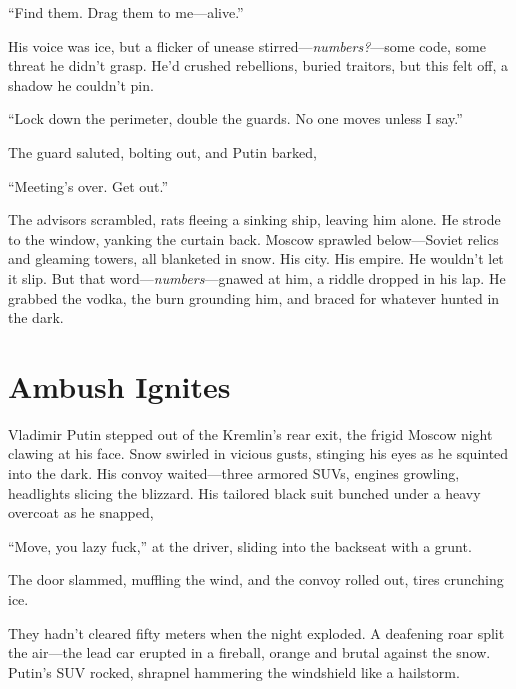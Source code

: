 \documentclass[12pt]{book}
\begin{document}
\begin{quoting}[leftmargin=1.5em, rightmargin=1em]
\enquote{Find them. Drag them to me—alive.}
\end{quoting}

His voice was ice, but a flicker of unease stirred—\emph{numbers?}—some code, some threat he didn’t grasp. He’d crushed rebellions, buried traitors, but this felt off, a shadow he couldn’t pin.

\begin{quoting}[leftmargin=1.5em, rightmargin=1em]
\enquote{Lock down the perimeter, double the guards. No one moves unless I say.}
\end{quoting}

The guard saluted, bolting out, and Putin barked,

\begin{quoting}[leftmargin=1.5em, rightmargin=1em]
\enquote{Meeting’s over. Get out.}
\end{quoting}

The advisors scrambled, rats fleeing a sinking ship, leaving him alone. He strode to the window, yanking the curtain back. Moscow sprawled below—Soviet relics and gleaming towers, all blanketed in snow. His city. His empire. He wouldn’t let it slip. But that word—\emph{numbers}—gnawed at him, a riddle dropped in his lap. He grabbed the vodka, the burn grounding him, and braced for whatever hunted in the dark.

\section{Ambush Ignites}

Vladimir Putin stepped out of the Kremlin’s rear exit, the frigid Moscow night clawing at his face. Snow swirled in vicious gusts, stinging his eyes as he squinted into the dark. His convoy waited---three armored SUVs, engines growling, headlights slicing the blizzard. His tailored black suit bunched under a heavy overcoat as he snapped,

\enquote{Move, you lazy fuck,} at the driver, sliding into the backseat with a grunt.

The door slammed, muffling the wind, and the convoy rolled out, tires crunching ice.

They hadn’t cleared fifty meters when the night exploded. A deafening roar split the air---the lead car erupted in a fireball, orange and brutal against the snow. Putin’s SUV rocked, shrapnel hammering the windshield like a hailstorm.
\end{document}
